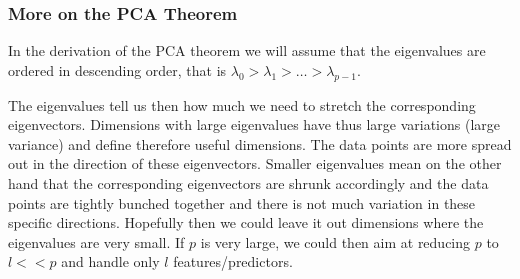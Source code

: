 \documentclass{beamer}
\begin{document}
\begin{frame}
\frametitle{More on the PCA Theorem}

In the derivation of the PCA theorem we will assume that the eigenvalues are ordered in descending order, that is
$\lambda_0 > \lambda_1 > \dots > \lambda_{p-1}$. 

The eigenvalues tell us then how much we need to stretch the
corresponding eigenvectors. Dimensions with large eigenvalues have
thus large variations (large variance) and define therefore useful
dimensions. The data points are more spread out in the direction of
these eigenvectors.  Smaller eigenvalues mean on the other hand that
the corresponding eigenvectors are shrunk accordingly and the data
points are tightly bunched together and there is not much variation in
these specific directions. Hopefully then we could leave it out
dimensions where the eigenvalues are very small. If $p$ is very large,
we could then aim at reducing $p$ to $l << p$ and handle only $l$
features/predictors.
\end{frame}
\end{document}
